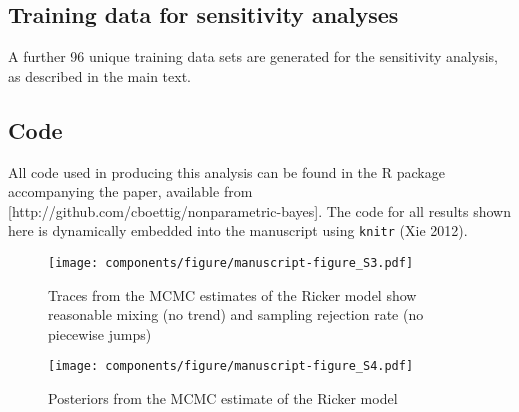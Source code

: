 \documentclass[author-year, 12pt,review]{elsarticle} %
\makeatletter
\def\maxwidth{\ifdim\Gin@nat@width>\linewidth\linewidth
\else\Gin@nat@width\fi}
\let\Oldincludegraphics\includegraphics
\renewcommand{\includegraphics}[1]{\Oldincludegraphics[width=\maxwidth]{#1}}
\makeatother
\begin{document}
\subsection{Training data for sensitivity
analyses}\label{training-data-for-sensitivity-analyses}

A further 96 unique training data sets are generated for the sensitivity
analysis, as described in the main text.

\subsection{Code}\label{code}

All code used in producing this analysis can be found in the R package
accompanying the paper, available from
{[}http://github.com/cboettig/nonparametric-bayes{]}. The code for all
results shown here is dynamically embedded into the manuscript using
\texttt{knitr} (Xie 2012).

\begin{figure}[htbp]
\centering
\texttt{[image: components/figure/manuscript-figure\_S3.pdf]}
\caption{Traces from the MCMC estimates of the Ricker model show
reasonable mixing (no trend) and sampling rejection rate (no piecewise
jumps)}
\end{figure}

\begin{figure}[htbp]
\centering
\texttt{[image: components/figure/manuscript-figure\_S4.pdf]}
\caption{Posteriors from the MCMC estimate of the Ricker model}
\end{figure}
\end{document}
